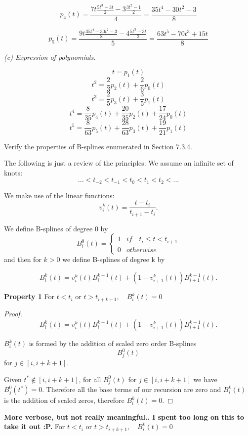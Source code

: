 \documentclass[12pt]{article}
\newenvironment{problem}[2][Problem]{\begin{trivlist}
\item[\hskip \labelsep {\bfseries #1}\hskip \labelsep {\bfseries #2.}]}{\end{trivlist}}
\begin{document}
\begin{problem}{7.10}
$$p_4(t)=\frac{7t\frac{5t^3-3t}{2}-3\frac{3t^2-1}{2}}{4}=\frac{35t^4-30t^2-3}{8}$$

$$p_5(t)
=\frac{9t\frac{35t^4-30t^2-3}{8}-4\frac{5t^3-3t}{2}}{5}
=\frac{63t^5-70t^3+15t}{8}$$


\textit{(c) Expression of polynomials.}

$$t = p_1(t)$$
$$t^2 = \frac{2}{3}p_2(t)+\frac{2}{6} p_0(t)$$
$$t^3 = \frac{2}{5}p_3(t)+\frac{3}{5}p_1(t)$$
$$t^4 = \frac{8}{35}p_4(t)+\frac{20}{35}p_2(t) +\frac{17}{24}p_0(t)$$
$$t^5 = \frac{8}{63}p_5(t)
+\frac{28}{63}p_3(t)
+\frac{19}{21}p_1(t)$$
\end{problem}

\begin{problem}{7.11}
Verify the properties of B-splines enumerated
in Section 7.3.4.

The following is just a review of the principles:
We assume an infinite set of knots:
$$...<t_{-2}<t_{-1}<t_0<t_1<t_2<...$$

We make use of the linear functions:
$$v_i^k(t)=\frac{t-t_i}{t_{i+1}-t_i}.$$

We define B-splines of degree 0 by
\[B_i^0(t) = \begin{cases} 
      1 & if \quad t_i \leq t < t_{i+1} \\
      0 & otherwise
   \end{cases}
\]
and then for $k>0$ we define B-splines of degree k by

$$B_i^k(t) = v_i^k(t)B_i^{k-1}(t)+(1-v_{i+1}^k(t))B_{i+1}^{k-1}(t).$$



\textbf{Property 1} For $t<t_i$ or $t > t_{i+k+1}, \quad B_i^k(t)=0$

\begin{proof}

$$B_i^k(t) = v_i^k(t)B_i^{k-1}(t)+(1-v_{i+1}^k(t))B_{i+1}^{k-1}(t).$$

$B_i^k(t)$ is formed by the addition of scaled zero order B-splines $$B_j^0(t)$$ for $j \in [i, i + k + 1]$.

Given $t^* \not\in [i, i+k+1]$, for all $B_j^0(t)$ for $j \in [i, i + k + 1]$ we have $B_j^0(t^*)=0$. Therefore all the base terms of our recursion are zero and $B_i^k(t)$ is the addition of scaled zeros, therefore $B_i^k(t)=0$.
\end{proof}

{\color{blue}
\textbf{More verbose, but not really meaningful.. I spent too long on this to take it out :P.}
For $t<t_i$ or $t > t_{i+k+1}, \quad B_i^k(t)=0$

}
\end{problem}
\end{document}

